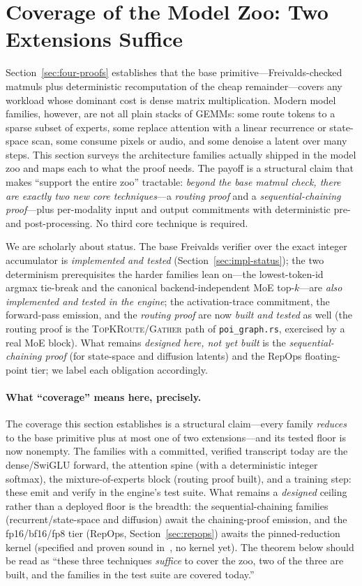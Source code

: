 \section{Coverage of the Model Zoo: Two Extensions Suffice}
\label{sec:families}

Section~\ref{sec:four-proofs} establishes that the base primitive---Freivalds-checked
matmuls plus deterministic recomputation of the cheap remainder---covers any workload
whose dominant cost is dense matrix multiplication. Modern model families, however, are
not all plain stacks of GEMMs: some route tokens to a sparse subset of experts, some
replace attention with a linear recurrence or state-space scan, some consume pixels or
audio, and some denoise a latent over many steps. This section surveys the architecture
families actually shipped in the \Zoo{} model zoo and maps each to what the proof needs.
The payoff is a structural claim that makes ``support the entire zoo'' tractable:
\emph{beyond the base matmul check, there are exactly two new core techniques}---a
\emph{routing proof} and a \emph{sequential-chaining proof}---plus per-modality input and
output commitments with deterministic pre- and post-processing. No third core technique
is required.

We are scholarly about status. The base Freivalds verifier over the exact integer
accumulator is \emph{implemented and tested} (Section~\ref{sec:impl-status}); the two
determinism prerequisites the harder families lean on---the lowest-token-id argmax
tie-break and the canonical backend-independent MoE top-$k$---are \emph{also implemented
and tested in the engine}; the activation-trace commitment, the forward-pass emission, and
the \emph{routing proof} are now \emph{built and tested} as well (the routing proof is the
\textsc{TopKRoute}/\textsc{Gather} path of \texttt{poi\_graph.rs}, exercised by a real MoE
block). What remains \emph{designed here, not yet built} is the \emph{sequential-chaining
proof} (for state-space and diffusion latents) and the RepOps floating-point tier; we
label each obligation accordingly.

\paragraph{What ``coverage'' means here, precisely.} The coverage this section establishes
is a structural claim---every family \emph{reduces} to the base primitive plus at most one
of two extensions---and its tested floor is now nonempty. The families with a committed,
verified transcript today are the dense/SwiGLU forward, the attention spine (with a
deterministic integer softmax), the mixture-of-experts block (routing proof built), and a
training step: these emit and verify in the engine's test suite. What remains a
\emph{designed} ceiling rather than a deployed floor is the breadth: the sequential-chaining
families (recurrent/state-space and diffusion) await the chaining-proof emission, and the
fp16/bf16/fp8 tier (RepOps, Section~\ref{sec:repops}) awaits the pinned-reduction kernel
(specified and proven sound in~\cite{poisoundness}, no kernel yet). The theorem below should
be read as ``these three techniques \emph{suffice} to cover the zoo, two of the three are
built, and the families in the test suite are covered today.''

